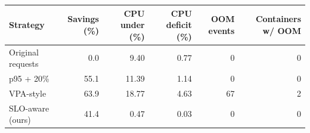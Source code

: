 \begin{tabular}{lrrrrr}\toprule
Strategy & Savings (\%) & CPU under (\%) & CPU deficit (\%) & OOM events & Containers w/ OOM \\\midrule
Original requests & 0.0 & 9.40 & 0.77 & 0 & 0 \\
p95 + 20\% & 55.1 & 11.39 & 1.14 & 0 & 0 \\
VPA-style & 63.9 & 18.77 & 4.63 & 67 & 2 \\
SLO-aware (ours) & 41.4 & 0.47 & 0.03 & 0 & 0 \\
\bottomrule\end{tabular}
